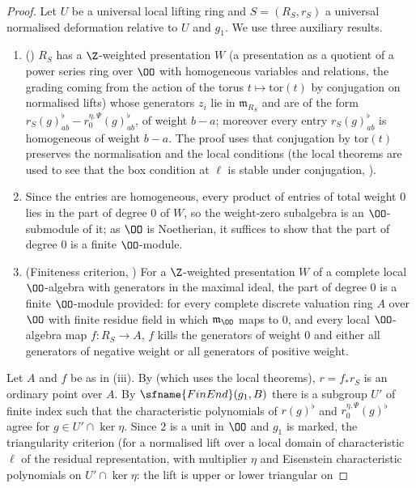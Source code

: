 \begin{proof}
Let $U$ be a universal local lifting ring and $S=(R_S,r_S)$ a universal normalised deformation relative to $U$ and
$g_1$. We use three auxiliary results.
\begin{enumerate}[label=(\roman*)]
\item () $R_S$ has a $\Z$-weighted presentation $W$ (a presentation as a quotient of a power series
ring over $\OO$ with homogeneous variables and relations, the grading coming from the action of the torus
$t\mapsto\mathrm{tor}(t)$ by conjugation on normalised lifts) whose generators $z_i$ lie in $\mathfrak m_{R_S}$ and are of
the form $r_S(g)^\flat_{ab}-r_0^{\eta,\Psi}(g)^\flat_{ab}$, of weight $b-a$; moreover every entry $r_S(g)^\flat_{ab}$ is
homogeneous of weight $b-a$. The proof uses that conjugation by $\mathrm{tor}(t)$ preserves the normalisation and the
local conditions (the local theorems are used to see that the box condition at $\ell$ is stable under conjugation,
).
\item Since the entries are homogeneous, every product of entries of total weight $0$ lies in the part of degree $0$
of $W$, so the weight-zero subalgebra is an $\OO$-submodule of it; as $\OO$ is Noetherian, it suffices to show that
the part of degree $0$ is a finite $\OO$-module.
\item (Finiteness criterion, ) For a $\Z$-weighted presentation $W$ of a complete
local $\OO$-algebra with generators in the maximal ideal, the part of degree $0$ is a finite $\OO$-module provided:
for every complete discrete valuation ring $A$ over $\OO$ with finite residue field in which $\mathfrak m_\OO$ maps to
$0$, and every local $\OO$-algebra map $f:R_S\to A$, $f$ kills the generators of weight $0$ and either all generators of
negative weight or all generators of positive weight.
\end{enumerate}
Let $A$ and $f$ be as in (iii). By  (which uses the local theorems),
$r=f_\ast r_S$ is an ordinary point over $A$. By $\sfname{FinEnd}(g_1,B)$ there is a subgroup $U'$ of finite index such
that the characteristic polynomials of $r(g)^\flat$ and $r_0^{\eta,\Psi}(g)^\flat$ agree for $g\in U'\cap\ker\eta$.
Since $2$ is a unit in $\OO$ and $g_1$ is marked, the triangularity criterion 
(for a normalised lift over a local domain of characteristic $\ell$ of the residual representation, with multiplier
$\eta$ and Eisenstein characteristic polynomials on $U'\cap\ker\eta$: the lift is upper or lower triangular on

\end{proof}
